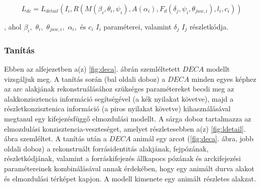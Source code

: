 \documentclass[12pt,a4]{article}
\begin{document}
                \begin{equation*}
                L_{dc} = L_{detail}(I_{i}, R(M (\beta_{i}, \theta_{i}, \psi_{i}), A(\alpha_{i}), F_{d}(\delta_{j} , \psi_{i}, \theta_{jaw,i}), l_{i}, c_{i}))
                \end{equation*}
            
         	      , ahol $\beta_{i},$ $\theta_{i},$ $\theta_{jaw,i},$ $\alpha_{i},$ és 
                $c_{i}$ $I_{i}$ paraméterei, valamint $\delta_{j}$ $I_{j}$ részletkódja.

            \subsubsection{Tanítás}
                Ebben az alfejezetben a(z) \ref{fig:deca}. ábrán szemléltetett $DECA$ modellt vizsgáljuk meg.
     	          A tanítás során (bal oldali doboz) a $DECA$ minden egyes képhez
     	          az arc alakjának rekonstruálásához szükséges paramétereket becsli meg az
     	          alakkonzisztencia információ segítségével (a kék nyilakat követve), majd
     	          a részletkonzisztenica információ (a piros nyilakat követve) kihasználásával
     	          megtanul egy kifejezésfüggő elmozdulási modellt. A sárga doboz tartalmazza
     	          az elmozdulási konzisztencia-veszteséget, amelyet részletesebben
                a(z) \ref{fig:ldetail}. ábra szemléltet.
     	          A tanítás után a $DECA$ animál egy arcot (\ref{fig:deca}. ábra, 
                jobb oldali doboz) a rekonstruált forrásidentitás alakjának, fejpózának, részletkódjának, valamint a forráskifejezés állkapocs pózának és arckifejezési paramétereinek kombinálásával annak érdekében, hogy egy animált durva alakot és elmozdulási térképet kapjon. A modell kimenete egy animált
     	          részletes alakzat.
\end{document}
